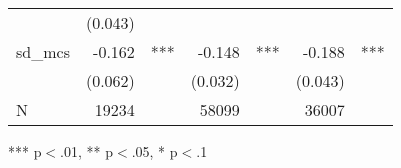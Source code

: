 \begin{table}[!h]
\begin{tabular}{lllllll}
  \multicolumn{1}{l}{} &
  \multicolumn{1}{r}{(0.043)} &
  \multicolumn{1}{l}{} \\
\multicolumn{1}{l}{sd\_mcs} &
  \multicolumn{1}{r}{-0.162} &
  \multicolumn{1}{l}{***} &
  \multicolumn{1}{r}{-0.148} &
  \multicolumn{1}{l}{***} &
  \multicolumn{1}{r}{-0.188} &
  \multicolumn{1}{l}{***} \\
\multicolumn{1}{l}{} &
  \multicolumn{1}{r}{(0.062)} &
  \multicolumn{1}{l}{} &
  \multicolumn{1}{r}{(0.032)} &
  \multicolumn{1}{l}{} &
  \multicolumn{1}{r}{(0.043)} &
  \multicolumn{1}{l}{} \\
\multicolumn{1}{l}{N} &
  \multicolumn{1}{r}{19234} &
  \multicolumn{1}{l}{} &
  \multicolumn{1}{r}{58099} &
  \multicolumn{1}{l}{} &
  \multicolumn{1}{r}{36007} &
  \multicolumn{1}{l}{} \\
\cline{1-7}
\end{tabular}

\footnotesize{
*** p$<$.01, ** p$<$.05, * p$<$.1
}
\end{table}

